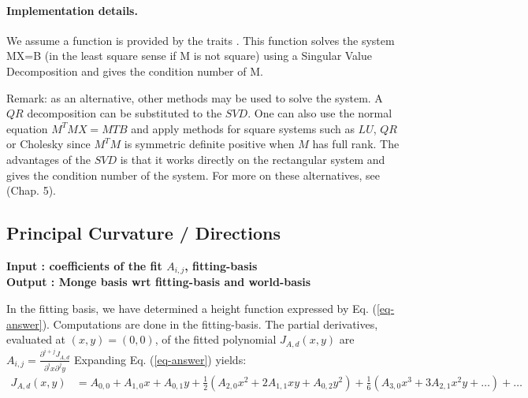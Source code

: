 \begin{ccAdvanced}
\paragraph{Implementation details.}
We assume a  function is provided by the traits
. This function solves the system MX=B (in the least square sense
if M is not square) using a Singular Value Decomposition and gives the
condition number of M. 

\medskip
Remark: as an alternative, other methods may be used to solve the
system. A $QR$ decomposition can be substituted to the $SVD$. One can
also use the normal equation $M^TMX=MTB$ and apply methods for square
systems such as $LU$, $QR$ or Cholesky since $M^TM$ is symmetric
definite positive when $M$ has full rank. 
The advantages of the $SVD$
is that it works directly on the rectangular system and gives the
condition number of the system. For more on these alternatives, see
\cite{gl-mc-83} (Chap. 5).

\subsection{Principal  Curvature / Directions}

{\bf Input : coefficients of the fit $A_{i,j}$, 
fitting-basis \\
Output : Monge basis wrt fitting-basis and world-basis
}

In the fitting basis, we have determined a height function expressed
by Eq. (\ref{eq-answer}). Computations are done in the fitting-basis.
The partial derivatives, evaluated at $(x,y)=(0,0)$, of the fitted
polynomial $J_{A,d}(x,y)$ are
$A_{i,j}=\frac{\partial^{i+j}J_{A,d}}{\partial^ix \partial^jy}$
Expanding Eq. (\ref{eq-answer}) yields:
\begin{eqnarray}
J_{A,d}(x,y)&=
A_{0,0}+A_{1,0}x+A_{0,1}y+\frac{1}{2}(A_{2,0}x^2+2A_{1,1}xy+A_{0,2}y^2) 
+ \frac{1}{6}(A_{3,0}x^3+3A_{2,1}x^2y+\ldots )+ \ldots 
\end{eqnarray}


\end{ccAdvanced}
